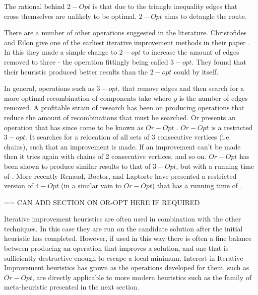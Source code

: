 
The rational behind $2-Opt$ is that due to the triangle inequality edges that cross themselves are unlikely to be optimal. $2-Opt$ aims to detangle the route.

There are a number of other operations suggested in the literature. Christofides and Eilon give one of the earliest iterative improvement methods in their paper \cite{CE:1969}. In this they made a simple change to $2-opt$ to increase the amount of edges removed to three - the operation fittingly being called $3-opt$. They found that their heuristic produced better results than the $2-opt$ could by itself. 

In general, operations such as $3-opt$, that remove edges and then search for a more optimal recombination of components take  where $y$ is the number of edges removed. A profitable strain of research has been on producing operations that reduce the amount of recombinations that must be searched. Or presents an operation that has since come to be known as $Or-Opt$ \cite{Or:1976}. $Or-Opt$ is a restricted $3-opt$. It searches for a relocation of all sets of 3 consecutive vertices (i.e. chains), such that an improvement is made. If an improvement can't be made then it tries again with chains of 2 consecutive vertices, and so on. $Or-Opt$ has been shown to produce similar results to that of $3-Opt$, but with a running time of . More recently Renaud, Boctor, and Laptorte have presented a restricted version of $4-Opt$ (in a similar vain to $Or-Opt$) that has a running time of  \cite{RBL:1996}. 

== CAN ADD SECTION ON OR-OPT HERE IF REQUIRED

Iterative improvement heuristics are often used in combination with the other techniques. In this case they are run on the candidate solution after the initial heuristic has completed. However, if used in this way there is often a fine balance between producing an operation that improves a solution, and one that is sufficiently destructive enough to escape a local minimum. Interest in Iterative Improvement heuristics has grown as the operations developed for them, such as $Or-Opt$, are directly applicable to more modern heuristics such as the family of meta-heuristic presented in the next section. 

